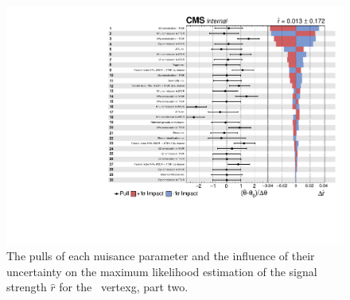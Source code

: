 \begin{figure}[htbp] 
	\centering
	\includegraphics[page=2,width=.99\linewidth,keepaspectratio]{6_Search/Figures/impact/171102Zct.pdf}
	\caption{The pulls of each nuisance parameter and the influence of their uncertainty on the maximum likelihood estimation of the signal strength $\hat{r}$ for the \Zct\ vertexg, part two.}
	\label{fig:impactsZct}
\end{figure}

\newpage


